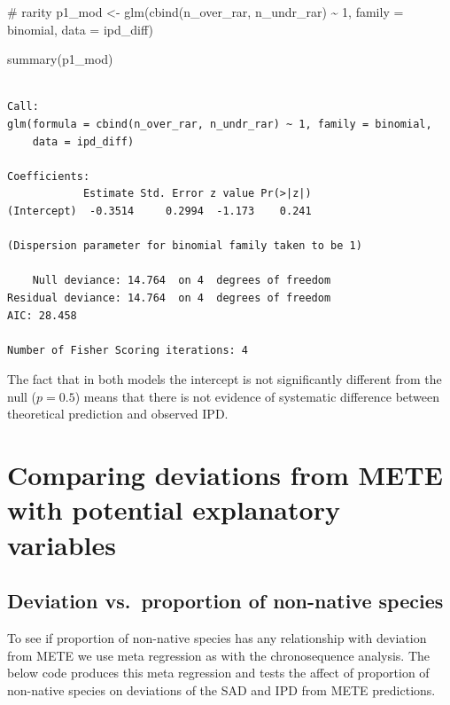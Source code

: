 \documentclass[
  letterpaper,
  DIV=11,
  numbers=noendperiod]{scrartcl}
\newenvironment{Shaded}{\begin{snugshade}}{\end{snugshade}}
\newcommand{\AttributeTok}[1]{\textcolor[rgb]{0.40,0.45,0.13}{#1}}
\newcommand{\CommentTok}[1]{\textcolor[rgb]{0.37,0.37,0.37}{#1}}
\newcommand{\DecValTok}[1]{\textcolor[rgb]{0.68,0.00,0.00}{#1}}
\newcommand{\FunctionTok}[1]{\textcolor[rgb]{0.28,0.35,0.67}{#1}}
\newcommand{\NormalTok}[1]{\textcolor[rgb]{0.00,0.23,0.31}{#1}}
\newcommand{\OtherTok}[1]{\textcolor[rgb]{0.00,0.23,0.31}{#1}}
\newcommand{\SpecialCharTok}[1]{\textcolor[rgb]{0.37,0.37,0.37}{#1}}
\begin{document}
\begin{Shaded}
\begin{Highlighting}[]
\CommentTok{\# rarity}
\NormalTok{p1\_mod }\OtherTok{\textless{}{-}} \FunctionTok{glm}\NormalTok{(}\FunctionTok{cbind}\NormalTok{(n\_over\_rar, n\_undr\_rar) }\SpecialCharTok{\textasciitilde{}} \DecValTok{1}\NormalTok{, }
              \AttributeTok{family =}\NormalTok{ binomial, }\AttributeTok{data =}\NormalTok{ ipd\_diff)}

\FunctionTok{summary}\NormalTok{(p1\_mod)}
\end{Highlighting}
\end{Shaded}

\begin{verbatim}

Call:
glm(formula = cbind(n_over_rar, n_undr_rar) ~ 1, family = binomial, 
    data = ipd_diff)

Coefficients:
            Estimate Std. Error z value Pr(>|z|)
(Intercept)  -0.3514     0.2994  -1.173    0.241

(Dispersion parameter for binomial family taken to be 1)

    Null deviance: 14.764  on 4  degrees of freedom
Residual deviance: 14.764  on 4  degrees of freedom
AIC: 28.458

Number of Fisher Scoring iterations: 4
\end{verbatim}

The fact that in both models the intercept is not significantly
different from the null (\(p = 0.5\)) means that there is not evidence
of systematic difference between theoretical prediction and observed
IPD.

\section{Comparing deviations from METE with potential explanatory
variables}\label{comparing-deviations-from-mete-with-potential-explanatory-variables}

\subsection{Deviation vs.~proportion of non-native
species}\label{deviation-vs.-proportion-of-non-native-species}

To see if proportion of non-native species has any relationship with
deviation from METE we use meta regression as with the chronosequence
analysis. The below code produces this meta regression and tests the
affect of proportion of non-native species on deviations of the SAD and
IPD from METE predictions.
\end{document}
